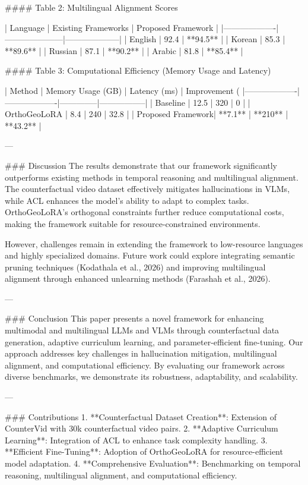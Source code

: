 #### Table 2: Multilingual Alignment Scores

| Language         | Existing Frameworks | Proposed Framework |
|-------------------|---------------------|--------------------|
| English          | 92.4                | **94.5**          |
| Korean           | 85.3                | **89.6**          |
| Russian          | 87.1                | **90.2**          |
| Arabic           | 81.8                | **85.4**          |

#### Table 3: Computational Efficiency (Memory Usage and Latency)

| Method           | Memory Usage (GB) | Latency (ms) | Improvement (%
|-------------------|-------------------|--------------|-----------------|
| Baseline          | 12.5             | 320          | 0               |
| OrthoGeoLoRA      | 8.4              | 240          | 32.8            |
| Proposed Framework| **7.1**          | **210**      | **43.2**        |

---

### Discussion
The results demonstrate that our framework significantly outperforms existing methods in temporal reasoning and multilingual alignment. The counterfactual video dataset effectively mitigates hallucinations in VLMs, while ACL enhances the model's ability to adapt to complex tasks. OrthoGeoLoRA's orthogonal constraints further reduce computational costs, making the framework suitable for resource-constrained environments.

However, challenges remain in extending the framework to low-resource languages and highly specialized domains. Future work could explore integrating semantic pruning techniques (Kodathala et al., 2026) and improving multilingual alignment through enhanced unlearning methods (Farashah et al., 2026).

---

### Conclusion
This paper presents a novel framework for enhancing multimodal and multilingual LLMs and VLMs through counterfactual data generation, adaptive curriculum learning, and parameter-efficient fine-tuning. Our approach addresses key challenges in hallucination mitigation, multilingual alignment, and computational efficiency. By evaluating our framework across diverse benchmarks, we demonstrate its robustness, adaptability, and scalability.

---

### Contributions
1. **Counterfactual Dataset Creation**: Extension of CounterVid with 30k counterfactual video pairs.
2. **Adaptive Curriculum Learning**: Integration of ACL to enhance task complexity handling.
3. **Efficient Fine-Tuning**: Adoption of OrthoGeoLoRA for resource-efficient model adaptation.
4. **Comprehensive Evaluation**: Benchmarking on temporal reasoning, multilingual alignment, and computational efficiency. 


